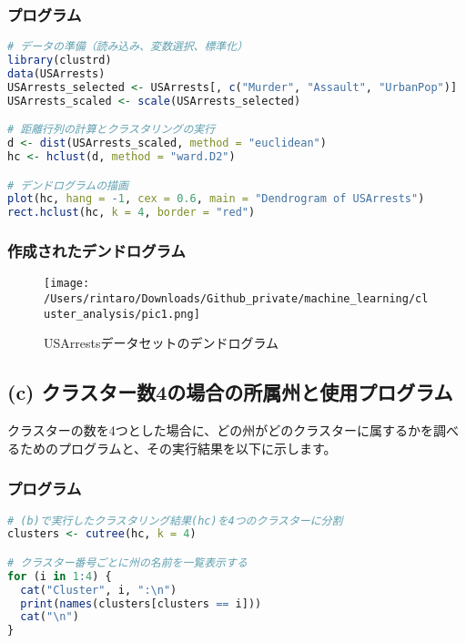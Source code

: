 \documentclass{article}
\begin{document}
\subsubsection*{プログラム}
\begin{lstlisting}[language=R, caption=デンドログラム作成用Rコード]
# データの準備（読み込み、変数選択、標準化）
library(clustrd)
data(USArrests)
USArrests_selected <- USArrests[, c("Murder", "Assault", "UrbanPop")]
USArrests_scaled <- scale(USArrests_selected)

# 距離行列の計算とクラスタリングの実行
d <- dist(USArrests_scaled, method = "euclidean")
hc <- hclust(d, method = "ward.D2")

# デンドログラムの描画
plot(hc, hang = -1, cex = 0.6, main = "Dendrogram of USArrests")
rect.hclust(hc, k = 4, border = "red") 
\end{lstlisting}

\subsubsection*{作成されたデンドログラム}
\begin{figure}[H]
    \centering
    \texttt{[image: /Users/rintaro/Downloads/Github\_private/machine\_learning/cluster\_analysis/pic1.png]}
    \caption{USArrestsデータセットのデンドログラム}
    \label{fig:dendrogram}
\end{figure}


\subsection{(c) クラスター数4の場合の所属州と使用プログラム}
クラスターの数を4つとした場合に、どの州がどのクラスターに属するかを調べるためのプログラムと、その実行結果を以下に示します。

\subsubsection*{プログラム}
\begin{lstlisting}[language=R, caption=クラスター所属特定用Rコード]
# (b)で実行したクラスタリング結果(hc)を4つのクラスターに分割
clusters <- cutree(hc, k = 4)

# クラスター番号ごとに州の名前を一覧表示する
for (i in 1:4) {
  cat("Cluster", i, ":\n")
  print(names(clusters[clusters == i]))
  cat("\n")
}
\end{lstlisting}
\end{document}
